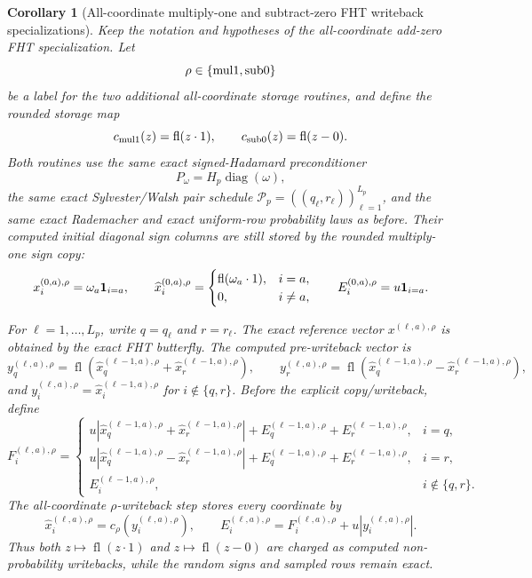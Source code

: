\documentclass[11pt]{article}
\newcommand{\fl}{\operatorname{fl}}
\newcommand{\diag}{\operatorname{diag}}
\newtheorem{corollary}[theorem]{Corollary}
\theoremstyle{remark}
\begin{document}
\begin{corollary}[All-coordinate multiply-one and subtract-zero FHT writeback specializations]
Keep the notation and hypotheses of the all-coordinate add-zero FHT
specialization.  Let
\[
  \rho\in\{{\rm mul1},{\rm sub0}\}
\]
be a label for the two additional all-coordinate storage routines, and define
the rounded storage map
\[
  c_{\rm mul1}(z)=\fl(z\cdot1),
  \qquad
  c_{\rm sub0}(z)=\fl(z-0).
\]
Both routines use the same exact signed-Hadamard preconditioner
\[
  P_\omega=H_p\diag(\omega),
\]
the same exact Sylvester/Walsh pair schedule
\(\mathcal P_p=((q_\ell,r_\ell))_{\ell=1}^{L_p}\), and the same exact
Rademacher and exact uniform-row probability laws as before.  Their computed
initial diagonal sign columns are still stored by the rounded multiply-one
sign copy:
\[
  x_i^{(0,a),\rho}=\omega_a{\bf 1}_{i=a},\qquad
  \widehat x_i^{(0,a),\rho}
  =
  \begin{cases}
    \fl(\omega_a\cdot1),& i=a,\\
    0,& i\ne a,
  \end{cases}
  \qquad
  E_i^{(0,a),\rho}=u{\bf 1}_{i=a}.
\]

For \(\ell=1,\ldots,L_p\), write \(q=q_\ell\) and \(r=r_\ell\).  The exact
reference vector \(x^{(\ell,a),\rho}\) is obtained by the exact FHT butterfly.
The computed pre-writeback vector is
\[
  y_q^{(\ell,a),\rho}
    =\fl(\widehat x_q^{(\ell-1,a),\rho}
          +\widehat x_r^{(\ell-1,a),\rho}),
  \qquad
  y_r^{(\ell,a),\rho}
    =\fl(\widehat x_q^{(\ell-1,a),\rho}
          -\widehat x_r^{(\ell-1,a),\rho}),
\]
and \(y_i^{(\ell,a),\rho}=\widehat x_i^{(\ell-1,a),\rho}\) for
\(i\notin\{q,r\}\).  Before the explicit copy/writeback, define
\[
  F_i^{(\ell,a),\rho}
  =
  \begin{cases}
    u|\widehat x_q^{(\ell-1,a),\rho}
      +\widehat x_r^{(\ell-1,a),\rho}|
      +E_q^{(\ell-1,a),\rho}+E_r^{(\ell-1,a),\rho},& i=q,\\
    u|\widehat x_q^{(\ell-1,a),\rho}
      -\widehat x_r^{(\ell-1,a),\rho}|
      +E_q^{(\ell-1,a),\rho}+E_r^{(\ell-1,a),\rho},& i=r,\\
    E_i^{(\ell-1,a),\rho},& i\notin\{q,r\}.
  \end{cases}
\]
The all-coordinate \(\rho\)-writeback step stores every coordinate by
\[
  \widehat x_i^{(\ell,a),\rho}=c_\rho(y_i^{(\ell,a),\rho}),
  \qquad
  E_i^{(\ell,a),\rho}
    =
    F_i^{(\ell,a),\rho}+u|y_i^{(\ell,a),\rho}|.
\]
Thus both \(z\mapsto\fl(z\cdot1)\) and \(z\mapsto\fl(z-0)\) are charged as
computed non-probability writebacks, while the random signs and sampled rows
remain exact.


\end{corollary}
\end{document}
